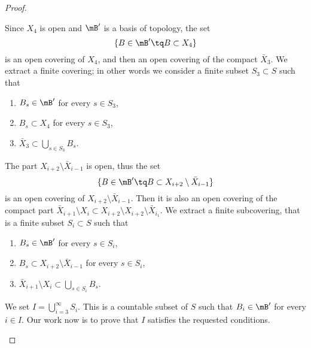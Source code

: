\begin{proof}
\begin{subproof}
		\spitem[\( S_3\)]
		Since \( X_4\) is open and \( \mB'\) is a basis of topology, the set
		\begin{equation}
			\{ B\in \mB'\tq B\subset X_4 \}
		\end{equation}
		is an open covering of \( X_4\), and then an open covering of the compact \( \bar X_3\). We extract a finite covering; in other words we consider a finite subset \( S_3\subset S\) such that
		\begin{enumerate}
			\item
			      \( B_s\in\mB'\) for every \( s\in S_3\),
			\item
			      \( B_s\subset X_4\) for every \( s\in S_3\),
			\item
			      \( \bar X_3\subset\bigcup_{s\in S_3}B_s\).
		\end{enumerate}
		The part \( X_{i+2}\setminus \bar X_{i-1}\) is open, thus the set
		\begin{equation}
			\{ B\in \mB'\tq B\subset X_{i+2}\setminus \bar X_{i-1} \}
		\end{equation}
		is an open covering of \( X_{i+2}\setminus \bar X_{i-1}\). Then it is also an open covering of the compact part \( \bar X_{i+1}\setminus X_i\subset X_{i+2}\setminus X_{i+2}\setminus \bar X_{i_1}\). We extract a finite subcovering, that is a finite subset \( S_i\subset S\) such that
		\begin{enumerate}
			\item
			      \( B_s\in \mB'\) for every \( s\in S_i\),
			\item
			      \( B_s\subset X_{i+2}\setminus\bar X_{i-1}\) for every \( s\in S_i\),
			\item
			      \( \bar X_{i+1}\setminus X_i\subset \bigcup_{s\in S_i}B_s\).
		\end{enumerate}
		We set \( I=\bigcup_{i=3}^{\infty}S_i\). This is a countable subset of \( S\) such that \( B_i\in \mB'\) for every \( i\in I\). Our work now is to prove that \( I\) satisfies the requested conditions.


\end{subproof}
\end{proof}
